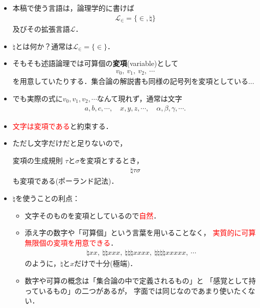 	\begin{itemize}
		\item 本稿で使う言語は，論理学的に書けば
			\begin{align}
				\mathcal{L}_{\in} = \{\in,\natural\}
			\end{align}
			及びその拡張言語$\mathcal{L}$．
			
		\item $\natural$とは何か？通常は$\mathcal{L}_{\in} = \{\in\}$．
		
		\item そもそも述語論理では可算個の{\bf 変項}{(variable)}として
			\begin{align}
				v_{0},\ v_{1},\ v_{2},\ \cdots
			\end{align}
			を用意していたりする．集合論の解説書も同様の記号列を変項としている...
			
\newpage
		\item でも実際の式に$v_{0},v_{1},v_{2},\cdots$なんて現れず，通常は文字
			\begin{align}
				a,b,c,\cdots, \quad x,y,z,\cdots, \quad \alpha,\beta,\gamma,\cdots.
			\end{align}
		
		\item \textcolor{red}{文字は変項である}と約束する．
			
		\item ただし文字だけだと足りないので，
			
			\begin{itembox}[l]{変項の生成規則}
				$\tau$と$\sigma$を変項とするとき，
				\begin{align}
					\natural \tau \sigma
				\end{align}
				も変項である(ポーランド記法)．
			\end{itembox}
	
\newpage
		\item $\natural$を使うことの利点：
			\begin{itemize}
				\item 文字そのものを変項としているので\textcolor{red}{自然}．
				\item 添え字の数字や「可算個」という言葉を用いることなく，
					\textcolor{red}{実質的に可算無限個の変項を用意できる}．
					\begin{align}
						\natural xx,\ \natural \natural xxx,\ \natural \natural \natural xxxx,\ 
						\natural \natural \natural \natural xxxxx,\ \cdots
					\end{align}
					のように，$\natural$と$x$だけで十分(極端)．
				\item 数字や可算の概念は「集合論の中で定義されるもの」と
					「感覚として持っているもの」の二つがあるが，
					字面では同じなのであまり使いたくない．
			\end{itemize}
	\end{itemize}

